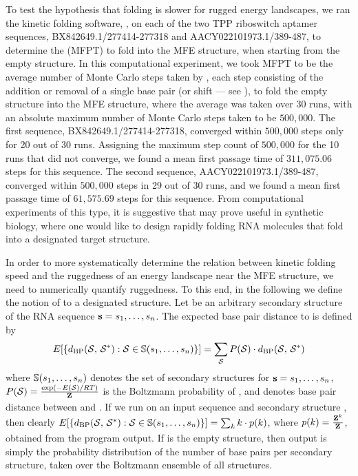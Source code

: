 To test the hypothesis that folding is slower for rugged energy landscapes,
we ran the kinetic folding software, \kinfold \cite{flamm},
on each of the two TPP riboswitch aptamer sequences,
BX842649.1/277414-277318 and AACY022101973.1/389-487,
to determine the \mfpt (MFPT) to
fold into the MFE structure, when starting from the empty structure.
In this computational
experiment, we took MFPT to be the average number of Monte Carlo steps
taken by \kinfold, each step consisting of the addition or removal
of a single base pair (or shift --- see \cite{flamm}), to fold the
empty structure into the MFE
structure, where the average was taken over $30$ runs, with an absolute
maximum number of Monte Carlo steps taken to be $500,000$.
The first sequence, BX842649.1/277414-277318, converged within $500,000$
steps only for 20 out of 30 runs. Assigning the maximum step count of
$500,000$ for the 10 runs that did not converge, we found a mean first
passage time of $311,075.06$ steps for this sequence.
The second sequence, AACY022101973.1/389-487, converged within $500,000$
steps in 29 out of 30 runs, and we found a mean first passage time of
$61,575.69$ steps for this sequence. From computational experiments of this
type, it is suggestive that \fftbor may prove useful in synthetic
biology,
where one would like to design rapidly folding RNA molecules that
fold into a designated target structure.

In order to more systematically determine the relation between kinetic
folding speed and the ruggedness of an energy landscape near the MFE structure,
we need to numerically quantify ruggedness. To this end, in the following
we define the notion of \ebpd to a designated
structure. Let \strSt be an arbitrary secondary structure of the RNA sequence
${\bf s} = s_1,\dots,s_n$.
The expected base pair distance to \strSt is defined by
\begin{align}
E[ \{ d_{\text{BP}}(\mathcal S,\,\mathcal S^*) : \mathcal S \in \mathbb{S}(s_1,\dots,s_n)\} ] =
\sum_{\mathcal S} P(\mathcal S) \cdot d_{\text{BP}}(\mathcal S,\,\mathcal S^*)
\end{align}
where
$\mathbb{S}(s_1,\dots,s_n)$ denotes the set of secondary structures for
${\bf s} = s_1,\dots,s_n$, $P(\mathcal S) = \frac{\exp(-E(\mathcal S)/RT)}{{\bf Z}^{}_{}}$ is the Boltzmann
probability of \str, and
\dBP{\str}{\strSt} denotes base pair distance between \str and \strSt.
If we run \fftbor on an input sequence \seq and secondary structure
\strSt, then clearly
$E[ \{ d_{\text{BP}}(\mathcal S,\,\mathcal S^*) : \mathcal S \in \mathbb{S}(s_1,\dots,s_n)\} ] =
\sum_{k} k \cdot p(k)$, where $p(k)=\frac{{\bf Z}^{k}_{}}{{\bf Z}^{}_{}}$, obtained from the
program output.  If \strSt is the empty structure, then \fftbor output
is simply the probability distribution of the number of base pairs per
secondary structure, taken over the Boltzmann ensemble of all structures.

